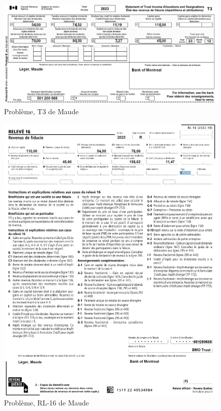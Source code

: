 \begin{figure}
	\centering
	\includegraphics[width=.9\textwidth]{probleme/chapitre-6/Maude-T3.png}
	\caption[]{Problème, T3 de Maude}
	\label{fig:chap6ProblemeMaudeT3}
\end{figure}
\begin{figure}
	\centering
	\includegraphics[width=.9\textwidth]{probleme/chapitre-6/Maude-RL16.png}
	\caption[]{Problème, RL-16 de Maude}
	\label{fig:chap6ProblemeMaudeRL16}
\end{figure}


